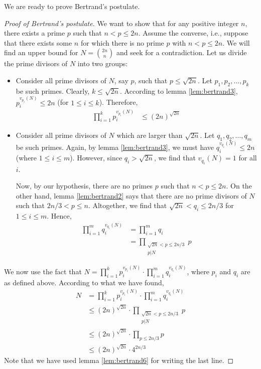 \documentclass{subfile}
\begin{document}
	We are ready to prove Bertrand's postulate.

	\begin{proof}[Proof of Bertrand's postulate]
		We want to show that for any positive integer $n$, there exists a prime $p$ such that $n <p \leq 2n$. Assume the converse, i.e., suppose that there exists some $n$ for which there is no prime $p$ with $n<p \leq 2n$. We will find an upper bound for $N = \binom{2n}{n}$ and seek for a contradiction. Let us divide the prime divisors of $N$ into two groups:
		\begin{itemize}
			\item Consider all prime divisors of $N$, say $p$, such that $p \leq \sqrt{2n}$. Let $p_1, p_2, \ldots, p_k$ be such primes. Clearly, $k \leq \sqrt{2n}$. According to lemma \autoref{lem:bertrand3}, $p_i^{v_{p_i}(N)} \leq 2n$ (for $1 \leq i \leq k$). Therefore,
			\begin{align*}
				\prod_{i=1}^{k} p_i^{v_{p_i}(N)}
					& \leq (2n)^{\sqrt{2n}}
			\end{align*}

			\item Consider all prime divisors of $N$ which are larger than $\sqrt{2n}$. Let $q_1, q_2, \ldots, q_m$ be such primes. Again, by lemma \autoref{lem:bertrand3}, we must have $q_i^{v_{q_i}(N)} \leq 2n$ (where $1 \leq i \leq m$). However, since $q_i > \sqrt{2n}$, we find that $v_{q_i}(N)=1$ for all $i$.

			Now, by our hypothesis, there are no primes $p$ such that $n < p \leq 2n$. On the other hand, lemma \autoref{lem:bertrand2} says that there are no prime divisors of $N$ such that $2n/3 < p \leq n$. Altogether, we find that $ \sqrt{2n} < q_i \leq 2n/3$ for $1 \leq i \leq m$. Hence,
			\begin{align*}
				\prod_{i=1}^{m} q_i^{v_{q_i}(N)}
					& =\prod_{i=1}^{m} q_i\\
					& = \prod\limits_{\substack{\sqrt{2n}<p\leq2n/3\\p|N}} p
			\end{align*}
		\end{itemize}
		We now use the fact that $N = 	\prod\limits_{i=1}^{k} p_i^{v_{p_i}(N)}\cdot \prod\limits_{i=1}^{m} q_i^{v_{q_i}(N)}$, where $p_i$ and $q_i$ are as defined above. According to what we have found,
		\begin{align*}
			N
				& =\prod\limits_{i=1}^{k} p_i^{v_{p_i}(N)}\cdot \prod\limits_{i=1}^{m} q_i^{v_{q_i}(N)}\\
				& \leq (2n)^{\sqrt{2n}} \cdot \prod\limits_{\substack{\sqrt{2n}<p\leq2n/3\\p|N}} p \\
				& \leq (2n)^{\sqrt{2n}} \cdot \prod_{p\leq2n/3} p\\
				& \leq (2n)^{\sqrt{2n}} \cdot 4^{2n/3}
		\end{align*}
		Note that we have used lemma \autoref{lem:bertrand6} for writing the last line.


\end{proof}
\end{document}
